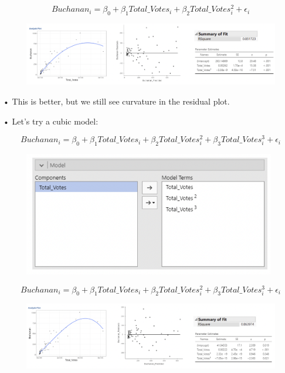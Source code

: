 \documentclass[
  letterpaper,
  DIV=11,
  numbers=noendperiod]{scrreprt}
\begin{document}
\[
Buchanan_i = \beta_0 + \beta_1Total\_Votes_i + \beta_2Total\_Votes^2_i + \epsilon_i
\]

\begin{figure}

{\centering \includegraphics{images/mod4_pt2_8.png}

}

\end{figure}

• This is better, but we still see curvature in the residual plot.

• Let's try a cubic model:

\[
Buchanan_i = \beta_0 + \beta_1Total\_Votes_i + \beta_2Total\_Votes^2_i +\beta_3Total\_Votes_i^3 + \epsilon_i
\]

\begin{figure}

{\centering \includegraphics[width=4.34375in,height=\textheight]{images/mod4_pt2_9.png}

}

\end{figure}

\[
Buchanan_i = \beta_0 + \beta_1Total\_Votes_i + \beta_2Total\_Votes^2_i +\beta_3Total\_Votes_i^3 + \epsilon_i
\]

\begin{figure}

{\centering \includegraphics{images/mod4_pt2_10.png}

}

\end{figure}
\end{document}
